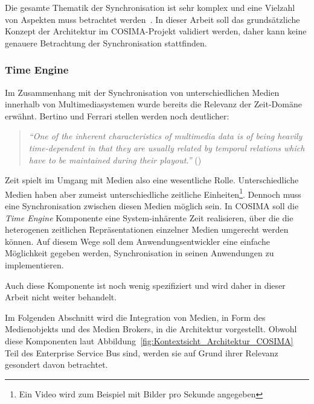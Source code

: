   Die gesamte Thematik der Synchronisation ist sehr komplex und eine Vielzahl von Aspekten muss betrachtet werden~\citep[S. 27ff]{bericht}. In dieser Arbeit soll das grundsätzliche Konzept der Architektur im COSIMA-Projekt validiert werden, daher kann keine genauere Betrachtung der Synchronisation stattfinden.


\subsubsection{Time Engine} %
\label{ssub:time_engine}

  Im Zusammenhang mit der Synchronisation von unterschiedlichen Medien innerhalb von Multimediasystemen wurde bereits die Relevanz der Zeit-Domäne erwähnt. Bertino und Ferrari stellen werden noch deutlicher:

  \begin{quote}
    \emph{"`One of the inherent characteristics of multimedia data is of being heavily time-dependent in that they are usually related by temporal relations which have to be maintained during their playout."'} (\citep[S. 612]{bertino1998tsm})
  \end{quote}
  
  Zeit spielt im Umgang mit Medien also eine wesentliche Rolle. Unterschiedliche Medien haben aber zumeist unterschiedliche zeitliche Einheiten\footnote{Ein Video wird zum Beispiel mit Bilder pro Sekunde angegeben}. Dennoch muss eine Synchronisation zwischen diesen Medien möglich sein. In COSIMA soll die \emph{Time Engine} Komponente eine System-inhärente Zeit realisieren, über die die heterogenen zeitlichen Repräsentationen einzelner Medien umgerecht werden können. Auf diesem Wege soll dem Anwendungsentwickler eine einfache Möglichkeit gegeben werden, Synchronisation in seinen Anwendungen zu implementieren.

  Auch diese Komponente ist noch wenig spezifiziert und wird daher in dieser Arbeit nicht weiter behandelt.
  
  Im Folgenden Abschnitt wird die Integration von Medien, in Form des Medienobjekts und des Medien Brokers, in die Architektur vorgestellt. Obwohl diese Komponenten laut Abbildung~\ref{fig:Kontextsicht_Architektur_COSIMA} Teil des Enterprise Service Bus sind, werden sie auf Grund ihrer Relevanz gesondert davon betrachtet.



